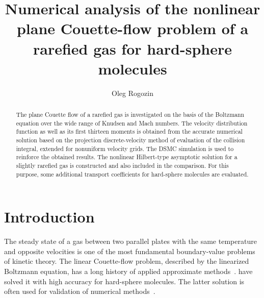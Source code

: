 \documentclass[final]{jfm} %
\begin{document}
\newtheorem{lemma}{Lemma}

\title{
    Numerical analysis of the nonlinear plane Couette-flow problem of a rarefied gas for hard-sphere molecules
}

\author{
    Oleg Rogozin
}

\maketitle

\begin{abstract}
    The plane Couette flow of a rarefied gas is investigated on the basis of the Boltzmann equation
    over the wide range of Knudsen and Mach numbers.
    The velocity distribution function as well as its first thirteen moments is obtained from
    the accurate numerical solution based on the projection discrete-velocity method
    of evaluation of the collision integral, extended for nonuniform velocity grids.
    The DSMC simulation is used to reinforce the obtained results.
    The nonlinear Hilbert-type asymptotic solution for a slightly rarefied gas
    is constructed and also included in the comparison.
    For this purpose, some additional transport coefficients for hard-sphere molecules are evaluated.
\end{abstract}


\section{Introduction}

The steady state of a gas between two parallel plates with the same temperature
and opposite velocities is one of the most fundamental boundary-value problems of kinetic theory.
The linear Couette-flow problem, described by the linearized Boltzmann equation,
has a long history of applied approximate methods~\citep{Willis1962}.
\citet{Ohwada1990} have solved it with high accuracy for hard-sphere molecules.
The latter solution is often used for validation of numerical methods~\citep[see e.g.][]{Fan2001,Aidun2010}.
\end{document}
